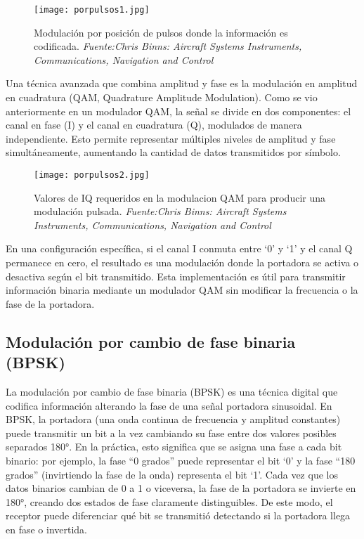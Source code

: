 \begin{figure}[H]
    \centering
    \texttt{[image: porpulsos1.jpg]}
    \caption{\centering Modulación por posición de pulsos donde la información es codificada.\textit{ Fuente:Chris Binns: Aircraft Systems Instruments, Communications, Navigation and Control}}
    \label{fig:porpulsos1}
\end{figure}

Una técnica avanzada que combina amplitud y fase es la modulación en amplitud en cuadratura (QAM, Quadrature Amplitude Modulation). Como se vio anteriormente en un modulador QAM, la señal se divide en dos componentes: el canal en fase (I)  y el canal en cuadratura (Q), modulados de manera independiente. Esto permite representar múltiples niveles de amplitud y fase simultáneamente, aumentando la cantidad de datos transmitidos por símbolo. 

\begin{figure}[H]
    \centering
    \texttt{[image: porpulsos2.jpg]}
    \caption{\centering Valores de IQ requeridos en la modulacion QAM para producir una modulación pulsada.\textit{ Fuente:Chris Binns: Aircraft Systems Instruments, Communications, Navigation and Control}}
    \label{fig:porpulsos2}
\end{figure}


En una configuración específica, si el canal I conmuta entre ‘0’ y ‘1’ y el canal Q permanece en cero, el resultado es una modulación donde la portadora se activa o desactiva según el bit transmitido. Esta implementación es útil para transmitir información binaria mediante un modulador QAM sin modificar la frecuencia o la fase de la portadora.


\subsection{Modulación por cambio de fase binaria (BPSK)}

La modulación por cambio de fase binaria (BPSK) es una técnica digital que codifica información alterando la fase de una señal portadora sinusoidal. En BPSK, la portadora (una onda continua de frecuencia y amplitud constantes) puede transmitir un bit a la vez cambiando su fase entre dos valores posibles separados 180°. En la práctica, esto significa que se asigna una fase a cada bit binario: por ejemplo, la fase “0 grados” puede representar el bit ‘0’ y la fase “180 grados” (invirtiendo la fase de la onda) representa el bit ‘1’. Cada vez que los datos binarios cambian de 0 a 1 o viceversa, la fase de la portadora se invierte en 180°, creando dos estados de fase claramente distinguibles. De este modo, el receptor puede diferenciar qué bit se transmitió detectando si la portadora llega en fase o invertida.

